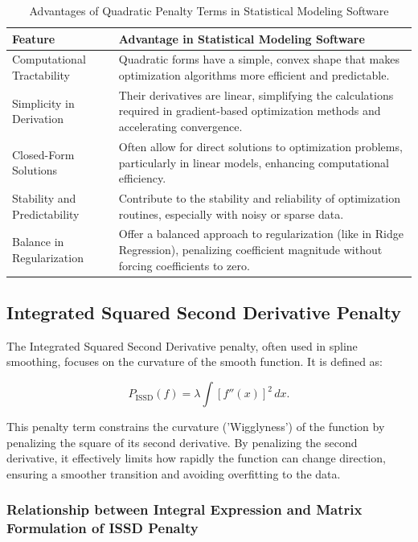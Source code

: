 \documentclass[12pt, twoside,hidelinks]{article}
\theoremstyle{definition}
\numberwithin{equation}{section}
\begin{document}
\begin{table}[H]
\centering
\begin{tabular}{|l|p{10cm}|}
\hline
\textbf{Feature} & \textbf{Advantage in Statistical Modeling Software} \\ \hline
Computational Tractability & Quadratic forms have a simple, convex shape that makes optimization algorithms more efficient and predictable. \\ \hline
Simplicity in Derivation & Their derivatives are linear, simplifying the calculations required in gradient-based optimization methods and accelerating convergence. \\ \hline
Closed-Form Solutions & Often allow for direct solutions to optimization problems, particularly in linear models, enhancing computational efficiency. \\ \hline
Stability and Predictability & Contribute to the stability and reliability of optimization routines, especially with noisy or sparse data. \\ \hline
Balance in Regularization & Offer a balanced approach to regularization (like in Ridge Regression), penalizing coefficient magnitude without forcing coefficients to zero. \\ \hline
\end{tabular}
\caption{Advantages of Quadratic Penalty Terms in Statistical Modeling Software}
\label{tab:quadratic_penalty_advantages}
\end{table}


\subsection{Integrated Squared Second Derivative Penalty}\label{sec:smooth:ISSD}

The Integrated Squared Second Derivative penalty, often used in spline smoothing, focuses on the curvature of the smooth function. It is defined as:

\begin{equation}
    P_{\text{ISSD}}(f) = \lambda \int [f''(x)]^2 \, dx.
    \label{eq:ISSD_penalty}
\end{equation}

This penalty term constrains the curvature ('Wigglyness') of the function by penalizing the square of its second derivative. By penalizing the second derivative, it effectively limits how rapidly the function can change direction, ensuring a smoother transition and avoiding overfitting to the data.

\subsubsection{Relationship between Integral Expression and Matrix Formulation of ISSD Penalty}\label{sec:smooth:ISSD:relation}
\end{document}
